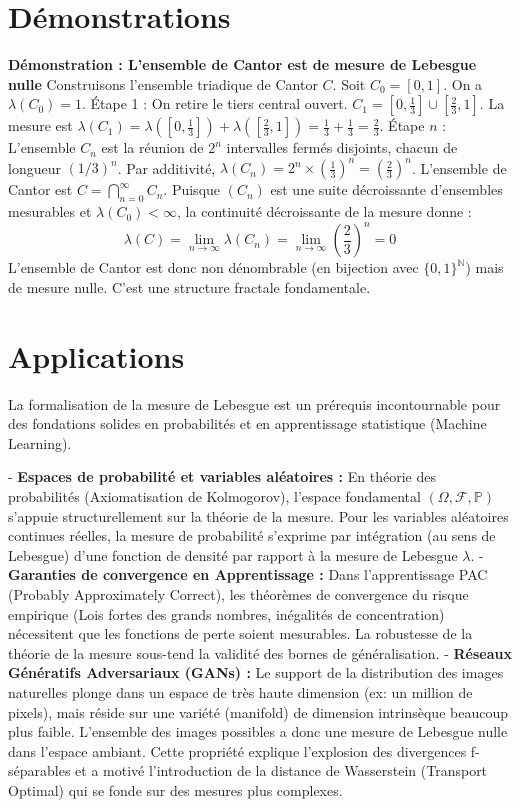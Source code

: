 \documentclass[11pt,a4paper]{article}
\begin{document}
\section{Démonstrations}

\textbf{Démonstration : L'ensemble de Cantor est de mesure de Lebesgue nulle}
Construisons l'ensemble triadique de Cantor $C$.
Soit $C_0 = [0, 1]$. On a $\lambda(C_0) = 1$.
Étape 1 : On retire le tiers central ouvert. $C_1 = [0, \frac{1}{3}] \cup [\frac{2}{3}, 1]$.
La mesure est $\lambda(C_1) = \lambda([0, \frac{1}{3}]) + \lambda([\frac{2}{3}, 1]) = \frac{1}{3} + \frac{1}{3} = \frac{2}{3}$.
Étape $n$ : L'ensemble $C_n$ est la réunion de $2^n$ intervalles fermés disjoints, chacun de longueur $(1/3)^n$.
Par additivité, $\lambda(C_n) = 2^n \times \left(\frac{1}{3}\right)^n = \left(\frac{2}{3}\right)^n$.
L'ensemble de Cantor est $C = \bigcap_{n=0}^\infty C_n$.
Puisque $(C_n)$ est une suite décroissante d'ensembles mesurables et $\lambda(C_0) < \infty$, la continuité décroissante de la mesure donne :
$$\lambda(C) = \lim_{n \to \infty} \lambda(C_n) = \lim_{n \to \infty} \left(\frac{2}{3}\right)^n = 0$$
L'ensemble de Cantor est donc non dénombrable (en bijection avec $\{0, 1\}^{\mathbb{N}}$) mais de mesure nulle. C'est une structure fractale fondamentale.

\section{Applications}

La formalisation de la mesure de Lebesgue est un prérequis incontournable pour des fondations solides en probabilités et en apprentissage statistique (Machine Learning).

- \textbf{Espaces de probabilité et variables aléatoires :} En théorie des probabilités (Axiomatisation de Kolmogorov), l'espace fondamental $(\Omega, \mathcal{F}, \mathbb{P})$ s'appuie structurellement sur la théorie de la mesure. Pour les variables aléatoires continues réelles, la mesure de probabilité s'exprime par intégration (au sens de Lebesgue) d'une fonction de densité par rapport à la mesure de Lebesgue $\lambda$.
- \textbf{Garanties de convergence en Apprentissage :} Dans l'apprentissage PAC (Probably Approximately Correct), les théorèmes de convergence du risque empirique (Lois fortes des grands nombres, inégalités de concentration) nécessitent que les fonctions de perte soient mesurables. La robustesse de la théorie de la mesure sous-tend la validité des bornes de généralisation.
- \textbf{Réseaux Génératifs Adversariaux (GANs) :} Le support de la distribution des images naturelles plonge dans un espace de très haute dimension (ex: un million de pixels), mais réside sur une variété (manifold) de dimension intrinsèque beaucoup plus faible. L'ensemble des images possibles a donc une mesure de Lebesgue nulle dans l'espace ambiant. Cette propriété explique l'explosion des divergences f-séparables et a motivé l'introduction de la distance de Wasserstein (Transport Optimal) qui se fonde sur des mesures plus complexes.
\end{document}
